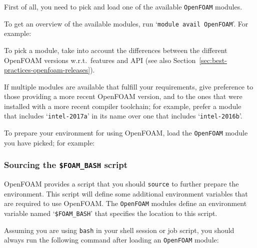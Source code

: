 First of all, you need to pick and load one of the available {\small\texttt{OpenFOAM}} modules.

To get an overview of the available modules, run `{\small\texttt{module avail OpenFOAM}}'. For example:

\begin{prompt}
\end{prompt}

To pick a module, take into account the differences between the different OpenFOAM versions w.r.t.\ features and
API (see also Section~\ref{sec:best-practices-openfoam-releases}).

If multiple modules are available that fulfill your requirements, give preference to those providing a more recent
OpenFOAM version, and to the ones that were installed with a more recent compiler toolchain; for example, prefer
a module that includes `{\small\texttt{intel-2017a}}' in its name over one that includes
`{\small\texttt{intel-2016b}}'.

To prepare your environment for using OpenFOAM, load the {\small\texttt{OpenFOAM}} module you have picked; for example:

\begin{prompt}
\end{prompt}

\subsubsection{Sourcing the {\small\texttt{\$FOAM\_BASH}} script}

OpenFOAM provides a script that you should \texttt{\small{source}} to further prepare the environment.
This script will define some additional environment variables that are required to use OpenFOAM.
The {\small\texttt{OpenFOAM}} modules define an environment variable named `\texttt{\small\$FOAM\_BASH}'
that specifies the location to this script.

Assuming you are using \texttt{\small{bash}} in your shell session or job script,
you should always run the following command after loading an \texttt{\small{OpenFOAM}} module:

\begin{prompt}
\end{prompt}


